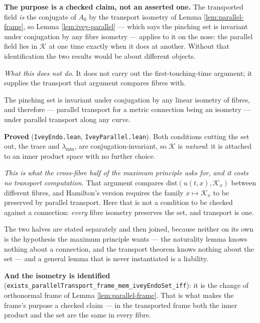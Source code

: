 \begin{lemma}
  \textbf{The purpose is a checked claim, not an asserted one.} The transported field
  \emph{is} the conjugate of $A_0$ by the transport isometry of Lemma
  \ref{lem:parallel-frame}, so Lemma \ref{lem:ivey-parallel} --- which says the pinching set
  is invariant under conjugation by any fibre isometry --- applies to it on the nose: the
  parallel field lies in $\mathcal{K}$ at one time exactly when it does at another. Without
  that identification the two results would be about different objects.

  \emph{What this does not do.} It does not carry out the first-touching-time argument; it
  supplies the transport that argument compares fibres with.
\end{lemma}

\begin{lemma}
  \label{lem:ivey-parallel}
  \leanok
  The pinching set is invariant under conjugation by any linear isometry of fibres, and
  therefore --- parallel transport for a metric connection being an isometry --- under
  parallel transport along any curve.

  \textbf{Proved} (\texttt{IveyEndo.lean}, \texttt{IveyParallel.lean}). Both conditions
  cutting the set out, the trace and $\lambda_{\min}$, are conjugation-invariant, so
  $\mathcal{K}$ is \emph{natural}: it is attached to an inner product space with no further
  choice.

  \emph{This is what the cross-fibre half of the maximum principle asks for, and it costs no
  transport computation.} That argument compares $\mathrm{dist}(u(t,x), \mathcal{K}_x)$
  between different fibres, and Hamilton's version requires the family $x \mapsto
  \mathcal{K}_x$ to be preserved by parallel transport. Here that is not a condition to be
  checked against a connection: \emph{every} fibre isometry preserves the set, and transport
  is one.

  The two halves are stated separately and then joined, because neither on its own is the
  hypothesis the maximum principle wants --- the naturality lemma knows nothing about a
  connection, and the transport theorem knows nothing about the set --- and a general lemma
  that is never instantiated is a liability.

  \textbf{And the isometry is identified}
  (\texttt{exists\_parallelTransport\_frame\_mem\_iveyEndoSet\_iff}): it is the change of
  orthonormal frame of Lemma \ref{lem:parallel-frame}. That is what makes the frame's purpose a
  checked claim --- in the transported frame both the inner product and the set are the same in
  every fibre.
\end{lemma}

